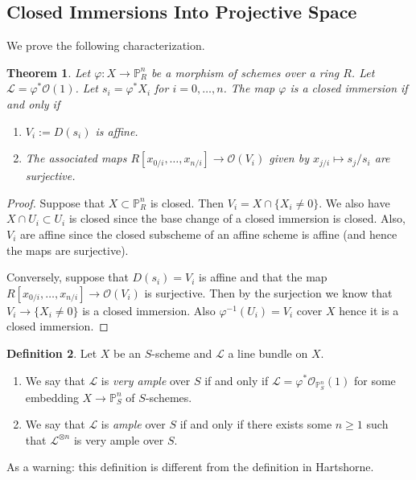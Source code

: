 \documentclass[12pt]{article}
\numberwithin{equation}{section}
\newtheorem{theorem}{Theorem}[subsection]
\theoremstyle{definition}
\newtheorem{definition}[theorem]{Definition}
\theoremstyle{remark}
\newcommand{\Ocal}{\mathcal{O}}
\newcommand{\PP}{\mathbb{P}}
\newcommand{\Lcal}{\mathcal{L}}
\begin{document}
\subsection{Closed Immersions Into Projective Space}
We prove the following characterization.
\begin{theorem}
	Let $\varphi: X \to \PP^n_R$ be a morphism of schemes over a ring $R$. 
	Let $\Lcal = \varphi^*\Ocal(1)$. 
	Let $s_i = \varphi^*X_i$ for $i=0,\ldots,n$. 
	The map $\varphi$ is a closed immersion if and only if
	\begin{enumerate}
		\item $V_i:=D(s_i)$ is affine. 
		\item The associated maps $R[x_{0/i},\ldots,x_{n/i}] \to \Ocal(V_i)$ given by $x_{j/i} \mapsto s_j/s_i$ are surjective.
	\end{enumerate}
\end{theorem}
\begin{proof}
	Suppose that $X \subset \PP^n_R$ is closed. 
	Then $V_i = X \cap \lbrace X_i \neq 0 \rbrace$. 
	We also have $X \cap U_i \subset U_i$ is closed since the base change of a closed immersion is closed. 
	Also, $V_i$ are affine since the closed subscheme of an affine scheme is affine (and hence the maps are surjective).
	
	Conversely, suppose that $D(s_i) = V_i$ is affine and that the map $R[x_{0/i},\ldots,x_{n/i}] \to \Ocal(V_i)$ is surjective. 
	Then by the surjection we know that $V_i \to \lbrace X_i \neq 0\rbrace$ is a closed immersion. 
	Also $\varphi^{-1}(U_i) = V_i$ cover $X$ hence it is a closed immersion.
\end{proof}

\begin{definition}
	Let $X$ be an $S$-scheme and $\Lcal$ a line bundle on $X$. 
	\begin{enumerate}
		\item We say that $\Lcal$ is \emph{very ample} over $S$ if and only if $\Lcal = \varphi^*\Ocal_{\PP^n_S}(1)$ for some embedding $X \to \PP^n_S$ of $S$-schemes.  
		\item We say that $\Lcal$ is \emph{ample} over $S$ if and only if there exists some $n\geq 1$ such that $\Lcal^{\otimes n}$ is very ample over $S$.
	\end{enumerate}
\end{definition}

As a warning: this definition is different from the definition in Hartshorne.
\end{document}
